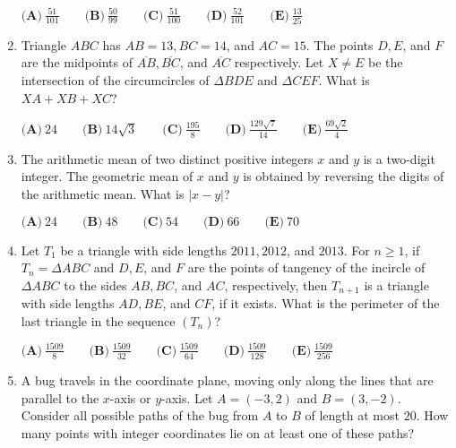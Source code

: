 \documentclass{article}
\begin{document}
\begin{enumerate}[label=\arabic*., itemsep=0.5em]
\(\textbf{(A)}\ \frac{51}{101} \qquad \textbf{(B)}\ \frac{50}{99} \qquad \textbf{(C)}\ \frac{51}{100} \qquad \textbf{(D)}\ \frac{52}{101} \qquad \textbf{(E)}\ \frac{13}{25}\)\par \vspace{0.5em}\item Triangle \(ABC\) has \(AB = 13, BC = 14\), and \(AC = 15\). The points \(D, E\), and \(F\) are the midpoints of \(\overline{AB}, \overline{BC}\), and \(\overline{AC}\) respectively. Let \(X \not= E\) be the intersection of the circumcircles of \(\Delta BDE\) and \(\Delta CEF\). What is \(XA + XB + XC\)?

\(\textbf{(A)}\ 24 \qquad \textbf{(B)}\ 14\sqrt{3} \qquad \textbf{(C)}\ \frac{195}{8} \qquad \textbf{(D)}\ \frac{129\sqrt{7}}{14} \qquad \textbf{(E)}\ \frac{69\sqrt{2}}{4}\)\par \vspace{0.5em}\item The arithmetic mean of two distinct positive integers \(x\) and \(y\) is a two-digit integer. The geometric mean of \(x\) and \(y\) is obtained by reversing the digits of the arithmetic mean. What is \(|x - y|\)?

\(\textbf{(A)}\ 24 \qquad \textbf{(B)}\ 48 \qquad \textbf{(C)}\ 54 \qquad \textbf{(D)}\ 66 \qquad \textbf{(E)}\ 70\)\par \vspace{0.5em}\item Let \(T_1\) be a triangle with side lengths \(2011, 2012\), and \(2013\). For \(n \geq 1\), if \(T_n = \Delta ABC\) and \(D, E\), and \(F\) are the points of tangency of the incircle of \(\Delta ABC\) to the sides \(AB, BC\), and \(AC\), respectively, then \(T_{n+1}\) is a triangle with side lengths \(AD, BE\), and \(CF\), if it exists. What is the perimeter of the last triangle in the sequence \(\left(T_n\right)\)?

\(\textbf{(A)}\ \frac{1509}{8} \qquad \textbf{(B)}\  \frac{1509}{32} \qquad \textbf{(C)}\  \frac{1509}{64} \qquad \textbf{(D)}\  \frac{1509}{128} \qquad \textbf{(E)}\  \frac{1509}{256}\)\par \vspace{0.5em}\item A bug travels in the coordinate plane, moving only along the lines that are parallel to the \(x\)-axis or \(y\)-axis. Let \(A = (-3, 2)\) and \(B = (3, -2)\). Consider all possible paths of the bug from \(A\) to \(B\) of length at most \(20\). How many points with integer coordinates lie on at least one of these paths?


\end{enumerate}
\end{document}
